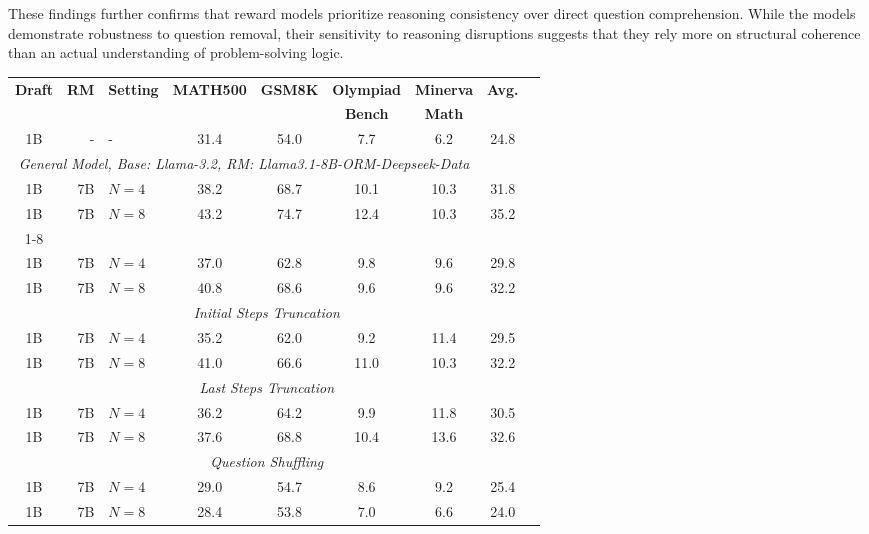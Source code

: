 \documentclass{article}
\begin{document}
These findings further confirms that reward models prioritize reasoning consistency over direct question comprehension. While the models demonstrate robustness to question removal, their sensitivity to reasoning disruptions suggests that they rely more on structural coherence than an actual understanding of problem-solving logic.


\begin{table*}[!t]
\caption{Best-of-$N$ results under different reward input modifications on Llama3.1-8B-ORM/PRM.}
\label{tab:llama}
\vskip 0.1in
\scriptsize
\begin{center}
\begin{tabular}{crlcccccl}
\toprule
\multirow{2}{*}{\textbf{Draft}} & \multirow{2}{*}{\textbf{RM}} & \multirow{2}{*}{\textbf{Setting}} & \multirow{2}{*}{\textbf{MATH500}} & \multirow{2}{*}{\textbf{GSM8K}} &  \textbf{Olympiad} &  \textbf{Minerva} & \multirow{2}{*}{\textbf{Avg.}} \\
 & & & &  &  \textbf{Bench} &  \textbf{Math} \\
\midrule
 1B & - & - & 31.4 & 54.0 & 7.7 &  6.2& 24.8\\
\midrule
\multicolumn{7}{c}{\textit{General Model, Base: Llama-3.2, RM: Llama3.1-8B-ORM-Deepseek-Data}} \\
\midrule
 1B & 7B & $N=4$ & 38.2 & 68.7	& 10.1 & 10.3 & 31.8 \\
 1B & 7B & $N=8$ & 43.2 & 74.7	& 12.4 & 10.3 & 35.2 \\
\cmidrule(lr){1-8}
\multicolumn{8}{c}{\textit{Question Truncation}} \\
 1B & 7B & $N=4$ & 37.0 & 62.8 & 9.8	& 9.6 & 29.8 \\
 1B & 7B & $N=8$ & 40.8 & 68.6	& 9.6 & 9.6	& 32.2 \\
\multicolumn{8}{c}{\textit{Initial Steps Truncation}} \\
 1B & 7B & $N=4$ & 35.2 & 62.0 & 9.2 & 11.4 & 29.5 \\
 1B & 7B & $N=8$ & 41.0 & 66.6	& 11.0 & 10.3 & 32.2 \\
\multicolumn{8}{c}{\textit{Last Steps Truncation}} \\
 1B & 7B & $N=4$ & 36.2 & 64.2	& 9.9 & 11.8 & 30.5 \\
 1B & 7B & $N=8$ & 37.6 & 68.8	& 10.4 & 13.6 & 32.6 \\
\multicolumn{8}{c}{\textit{Question Shuffling}} \\
 1B & 7B & $N=4$ & 29.0 & 54.7	& 8.6 & 9.2	& 25.4 \\
 1B & 7B & $N=8$ & 28.4 & 53.8	& 7.0 &	6.6	& 24.0 \\

\end{tabular}
\end{center}
\end{table*}
\end{document}
